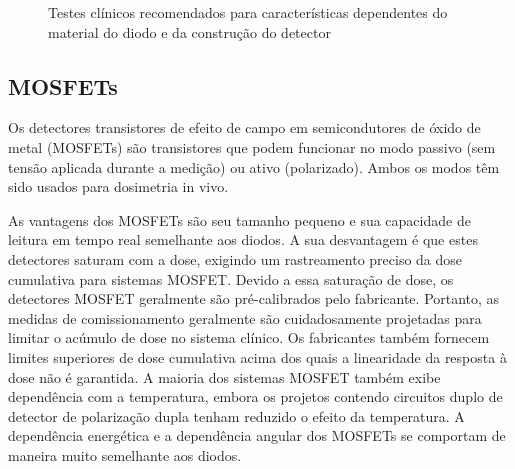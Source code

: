 \documentclass[11pt,a4paper]{article}
\begin{document}
	\begin{figure}[h]
		\centering
		\caption{Testes clínicos recomendados para características dependentes do material do diodo e da construção do detector}
		\label{fig:testesDiodo}
	\end{figure}

\subsection{MOSFETs}

	Os detectores transistores de efeito de campo em semicondutores de óxido de metal (MOSFETs) são transistores que podem funcionar no modo passivo (sem tensão aplicada durante a medição) ou ativo (polarizado). Ambos os modos têm sido usados para dosimetria in vivo.
	
	As vantagens dos MOSFETs são seu tamanho pequeno e sua capacidade de leitura em tempo real semelhante aos diodos. A sua desvantagem é que estes detectores saturam com a dose, exigindo um rastreamento preciso da dose cumulativa para sistemas MOSFET. Devido a essa saturação de dose, os detectores MOSFET geralmente são pré-calibrados pelo fabricante. Portanto, as medidas de comissionamento geralmente são cuidadosamente projetadas para limitar o acúmulo de dose no sistema clínico. Os fabricantes também fornecem limites superiores de dose cumulativa acima dos quais a linearidade da resposta à dose não é garantida. A maioria dos sistemas MOSFET também exibe dependência com a temperatura, embora os projetos contendo  circuitos duplo de detector de polarização dupla tenham reduzido o efeito da temperatura. A dependência energética e a dependência angular dos MOSFETs se comportam de maneira muito semelhante aos diodos.
\end{document}
